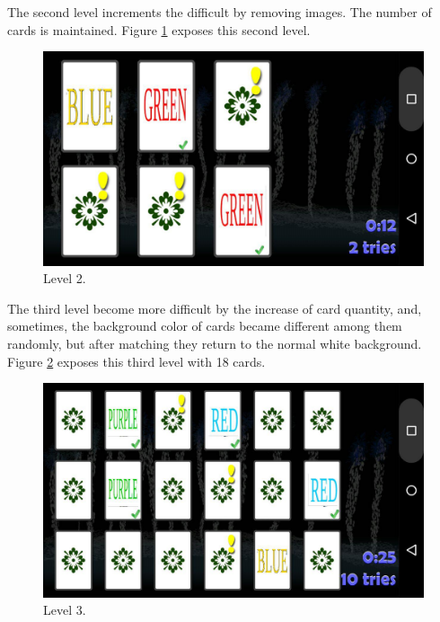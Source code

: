 The second level increments the difficult by removing images. The number of cards is maintained. Figure \ref{lv2} exposes this second level.

						\begin{figure}[htp]
							\begin{center}
								\includegraphics[scale=0.35]{chapters/desenvolvimento/img/memorystroop.jpg}
								\caption{Level 2.}
								\label{lv2}
							\end{center}
						\end{figure}

The third level become more difficult by the increase of card quantity, and, sometimes, the background color of cards became different among them randomly, but after matching they return to the normal white background. Figure \ref{lv3} exposes this third level with 18 cards.


						\begin{figure}[htp]
							\begin{center}
								\includegraphics[scale=0.35]{chapters/desenvolvimento/img/memorystroop2.jpg}
								\caption{Level 3.}
								\label{lv3}
							\end{center}
						\end{figure}

